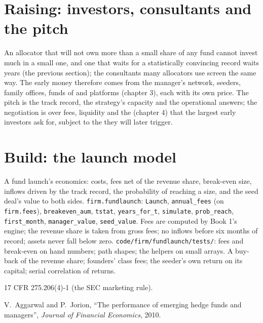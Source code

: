 \section{Raising: investors, consultants and the pitch}

An allocator that will not own more than a small share of any fund cannot invest much in a small one, and one that waits for a statistically
convincing record waits years (the previous section); the consultants many allocators use screen the same way. The early money therefore comes
from the manager's network, seeders, family offices, funds of  and platforms (chapter 3), each with its own price. The pitch is the track record, the strategy's capacity and the operational
answers; the negotiation is over fees, liquidity and the  (chapter 4) that the largest early investors ask for, subject to the
 they will later trigger.

\section{Build: the launch model}\label{bld:fm:launching-a-fund-and-raising-capital:fundlaunch}

\begin{build}
 A fund launch's economics: costs, fees net of the revenue share, break-even size, inflows driven by the track record, the
probability of reaching a size, and the seed deal's value to both sides.
 \texttt{firm.fundlaunch}: \texttt{Launch}, \texttt{annual\_fees} (on \texttt{firm.fees}), \texttt{breakeven\_aum}, \texttt{tstat},
\texttt{years\_for\_t}, \texttt{simulate}, \texttt{prob\_reach}, \texttt{first\_month}, \texttt{manager\_value}, \texttt{seed\_value}.
 Fees are computed by Book 1's engine; the revenue share is taken from gross fees; no inflows before six months of record; assets
never fall below zero.
 \texttt{code/firm/fundlaunch/tests/}: fees and break-even on hand numbers; path shapes; the helpers on small arrays.
 A buy-back of the revenue share; founders' class fees; the seeder's own return on its capital; serial correlation of returns.
\end{build}

\begin{omsources}
\item 17 CFR 275.206(4)-1 (the SEC marketing rule).
\item V.~Aggarwal and P.~Jorion, ``The performance of emerging hedge funds and managers'', \emph{Journal of Financial Economics}, 2010.
\end{omsources}


